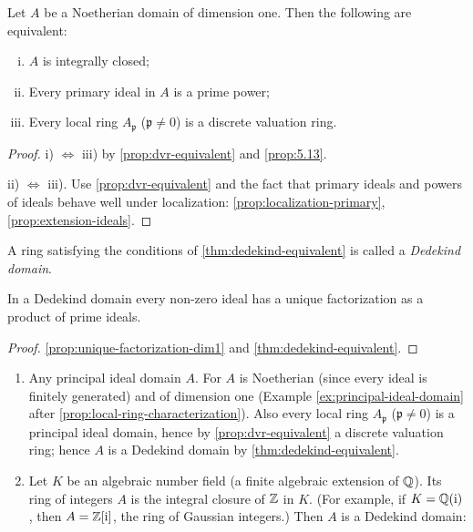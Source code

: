 \begin{theorem}\label{thm:dedekind-equivalent}
Let $A$ be a Noetherian domain of dimension one. Then the following are equivalent:
\begin{enumerate}[i)]
    \item $A$ is integrally closed;
    \item Every primary ideal in $A$ is a prime power;
    \item Every local ring $A_{\mathfrak{p}}$ ($\mathfrak{p} \neq 0$) is a discrete valuation ring.
\end{enumerate}
\end{theorem}

\begin{proof}
i) $\iff$ iii) by \eqref{prop:dvr-equivalent} and \eqref{prop:5.13}.

ii) $\iff$ iii). Use \eqref{prop:dvr-equivalent} and the fact that primary ideals and powers of ideals behave well under localization: \eqref{prop:localization-primary}, \eqref{prop:extension-ideals}.
\end{proof}

A ring satisfying the conditions of \eqref{thm:dedekind-equivalent} is called a \emph{Dedekind domain}.

\begin{corollary}\label{cor:dedekind-unique-factorization}
In a Dedekind domain every non-zero ideal has a unique factorization as a product of prime ideals.
\end{corollary}

\begin{proof}
\eqref{prop:unique-factorization-dim1} and \eqref{thm:dedekind-equivalent}.
\end{proof}

\begin{examples}
\begin{enumerate}[1)]
    \item Any principal ideal domain $A$. For $A$ is Noetherian (since every ideal is finitely generated) and of dimension one (Example \ref{ex:principal-ideal-domain} after \eqref{prop:local-ring-characterization}). Also every local ring $A_{\mathfrak{p}}$ ($\mathfrak{p} \neq 0$) is a principal ideal domain, hence by \eqref{prop:dvr-equivalent} a discrete valuation ring; hence $A$ is a Dedekind domain by \eqref{thm:dedekind-equivalent}.
    
    \item Let $K$ be an algebraic number field (a finite algebraic extension of $\mathbb{Q}$). Its ring of integers $A$ is the integral closure of $\mathbb{Z}$ in $K$. (For example, if $K = \mathbb{Q}(\mathrm{i})$, then $A = \mathbb{Z}[\mathrm{i}]$, the ring of Gaussian integers.) Then $A$ is a Dedekind domain:
\end{enumerate}
\end{examples}

